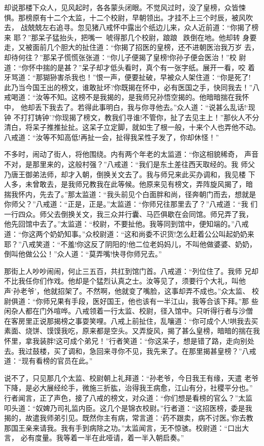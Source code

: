 却说那楼下众人，见风起时，各各蒙头闭眼。不觉风过时，没了皇榜，众皆悚
惧。那榜原有十二个太监，十二个校尉，早朝领出。才挂不上三个时辰，被风吹去，
战兢兢左右追寻。忽见猪八戒怀中露出个纸边儿来，众人近前道：“你揭了榜来
耶？”那呆子猛抬头，把嘴一，唬得那几个校尉，踉踉，跌倒在地。他却转
身要走，又被面前几个胆大的扯住道：“你揭了招医的皇榜，还不进朝医治我万岁
去，却待何往？”那呆子慌慌张张道：“你儿子便揭了皇榜!你孙子便会医治！”校
尉道：“你怀中揣的是甚？”呆子却才低头看时，真个有一张字纸。展开一看，咬
着牙骂道：“那猢狲害杀我也！”恨一声，便要扯破，早被众人架住道：“你是死了!
此乃当今国王出的榜文，谁敢扯坏?你既揭在怀中，必有医国之手，快同我去！”八
戒喝道：“汝等不知。这榜不是我揭的，是我师兄孙悟空揭的。他暗暗揣在我怀中，
他却丢下我去了。若得此事明白，我与你寻他去。”众人道：“说甚么乱话!‘现钟
不打打铸钟’?你现揭了榜文，教我们寻谁!不管你，扯了去见主上！”那伙人不分
清白，将呆子推推扯扯。这呆子立定脚，就如生了根一般，十来个人也弄他不动。
八戒道：“汝等不知高低!再扯一会，扯得我呆性子发了，你却休怪！”

不多时，闹动了街人，将他围绕。内有两个年老的太监道：“你这相貌稀奇，
声音不对，是那里来的，这般村强？”八戒道：“我们是东土差往西天取经的。我
师父乃唐王御弟法师，却才入朝，倒换关文去了。我与师兄来此买办调和，我见楼
下人多，未曾敢去，是我师兄教我在此等候。他原来见有榜文，弄阵旋风揭了，暗
揣我怀内，先去了。”那太监道：“我头前见个白面胖和尚，径奔朝门而去，想就是
你师父？”八戒道：“正是，正是。”太监道：“你师兄往那里去了？”八戒道：“我
们一行四众。师父去倒换关文，我三众并行囊、马匹俱歇在会同馆。师兄弄了我，
他先回馆中去了。”太监道：“校尉，不要扯他。我等同到馆中，便知端的。”八戒
道：“你这两个奶奶知事。”众校尉道：“这和尚委不识货!怎么赶着公公叫起奶奶来
耶？”八戒笑道：“不羞!你这反了阴阳的!他二位老妈妈儿，不叫他做婆婆、奶奶，
倒叫他做公公！”众人道：“莫弄嘴!快寻你师兄去。”

那街上人吵吵闹闹，何止三五百，共扛到馆门首。八戒道：“列位住了。我师
兄却不比我任你们作戏。他却是个猛烈认真之士。汝等见了，须要行个大礼，叫他
声‘孙老爷’，他就招架了。不然啊，他就变了嘴脸，这事却弄不成也。”众太监、
校尉俱道：“你师兄果有手段，医好国王，他也该有一半江山，我等合该下拜。”那
些闲杂人都在门外喧哗。八戒领着一行太监、校尉，径入馆中。只听得行者与沙僧
在客房里正说那揭榜之事耍笑哩。八戒上前扯住，乱嚷道：“你可成个人!哄我去买
素面、烧饼、馍馍我吃，原来都是空头。又弄旋风，揭了甚么皇榜，暗暗的揣在我
怀里，拿我装胖!这可成个弟兄！”行者笑道：“你这呆子，想是错了路，走向别处
去。我过鼓楼，买了调和，急回来寻你不见，我先来了。在那里揭甚皇榜？”八戒
道：“现有看榜的官员在此。”

说不了，只见那几个太监、校尉朝上礼拜道：“孙老爷，今日我王有缘，天遣
老爷下降，是必大展经纶手，微施三折肱，治得我王病愈，江山有分，社稷平分也。”
行者闻言，正了声色，接了八戒的榜文，对众道：“你们想是看榜的官么？”太监
叩头道：“奴婢乃司礼监内臣。这几个是锦衣校尉。”行者道：“这招医榜，委是我
揭的，故遣我师弟引见。既然你主有病，常言道：‘药不跟卖，病不讨医。’你去教
那国王亲来请我。我有手到病除之功。”太监闻言，无不惊骇。校尉道：“口出大言，
必有度量。我等着一半在此哑请，着一半入朝启奏。”

